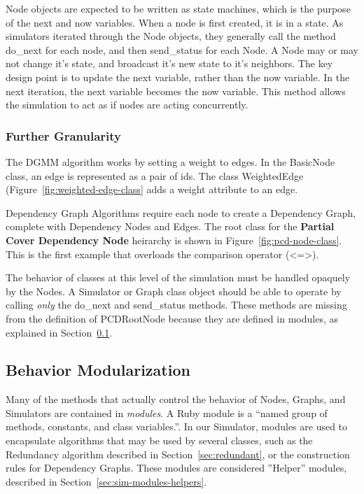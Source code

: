 \documentclass[technote, 10pt, letter]{IEEEtran}
\begin{document}


Node objects are expected to be written as state machines, which is the purpose of the next and now variables. When a node is first created, it is in a state. As simulators iterated through the Node objects, they generally call the method {\ttfamily do\_next} for each node, and then {\ttfamily send\_status} for each Node. A Node may or may not change it's state, and broadcast it's new state to it's neighbors. The key design point is to update the {\ttfamily next} variable, rather than the {\ttfamily now} variable. In the next iteration, the {\ttfamily next} variable becomes the {\ttfamily now} variable. This method allows the simulation to act as if nodes are acting concurrently.

\subsubsection{Further Granularity}

The DGMM algorithm works by setting a weight to edges. In the {\ttfamily BasicNode} class, an edge is represented as a pair of ids. The class {\ttfamily WeightedEdge} (Figure~\ref{fig:weighted-edge-class} adds a {\ttfamily weight} attribute to an edge. 

Dependency Graph Algorithms require each node to create a Dependency Graph, complete with Dependency Nodes and Edges. The root class for the {\bfseries Partial Cover Dependency Node} heirarchy is shown in Figure~\ref{fig:pcd-node-class}. This is the first example that overloads the comparison operator ({\ttfamily <=>}). 

The behavior of classes at this level of the simulation must be handled opaquely by the Nodes. A Simulator or Graph class object should be able to operate by calling {\em only} the {\ttfamily do\_next} and {\ttfamily send\_status} methods. These methods are missing from the definition of PCDRootNode because they are defined in modules, as explained in Section~\ref{sec:sim-modules}.




\subsection{Behavior Modularization}
\label{sec:sim-modules}

Many of the methods that actually control the behavior of Nodes, Graphs, and Simulators are contained in {\em modules}. A Ruby module is a ``named group of methods, constants, and class variables.''\cite{1408408}. In our Simulator, modules are used to encapsulate algorithms that may be used by several classes, such as the Redundancy algorithm described in Section~\ref{sec:redundant}, or the construction rules for Dependency Graphs. These modules are considered ''Helper'' modules, described in Section~\ref{sec:sim-modules-helpers}.
\end{document}
